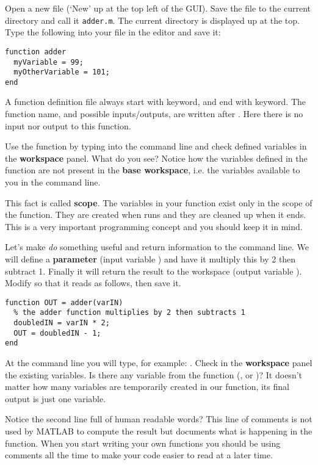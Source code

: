 \documentclass{article}
\begin{document}
Open a new file (`New' up at the top left of the GUI). 
Save the file to the current directory and call it \verb|adder.m|.
The current directory is displayed up at the top. 
Type the following into your file in the editor and save it:
\begin{lstlisting}
function adder
  myVariable = 99;
  myOtherVariable = 101;
end
\end{lstlisting}
A function definition file always start with  keyword, and end with  keyword.
The function name, and possible inputs/outputs, are written after .
Here there is no input nor output to this function.

Use the function by typing  into the command line and check defined variables in the \textbf{workspace} panel. What do you see?
Notice how the variables defined in the  function are not present in the \textbf{base workspace}, i.e. the variables available to you in the command line.

This fact is called \textbf{scope}.
The variables in your  function exist only in the scope of the  function.
They are created when  runs and they are cleaned up when it ends.
This is a very important programming concept and you should keep it in mind.

Let's make  \emph{do} something useful and return information to the command line.
We will define a \textbf{parameter} (input variable ) and have it multiply this by 2 then subtract 1.
Finally it will return the result to the workspace (output variable ).
Modify  so that it reads as follows, then save it.
\begin{lstlisting}
function OUT = adder(varIN)
  % the adder function multiplies by 2 then subtracts 1
  doubledIN = varIN * 2;
  OUT = doubledIN - 1;
end
\end{lstlisting}

At the command line you will type, for example: .
Check in the \textbf{workspace} panel the existing variables.
Is there any variable from the function (,  or )?
It doesn't matter how many variables are temporarily created in our function, its final output is just one variable.

Notice the second line full of human readable words?
This line of comments is not used by MATLAB to compute the result but documents what is happening in the function.
When you start writing your own functions you should be using comments all the time to make your code easier to read at a later time.
\end{document}
